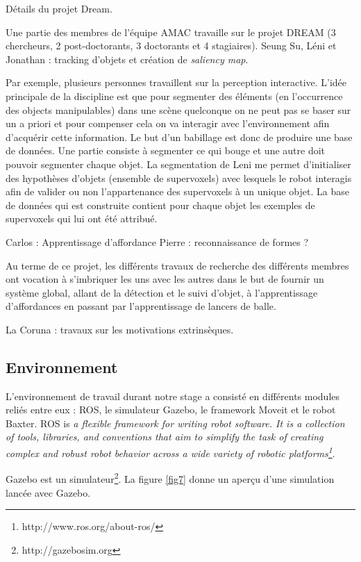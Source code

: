 \documentclass{llncs}
\begin{document}
Détails du projet Dream.

Une partie des membres de l'équipe AMAC travaille sur le projet DREAM (3 chercheurs, 2 post-doctorants, 3 doctorants et 4 stagiaires).
Seung Su, Léni et Jonathan : tracking d'objets et création de \textit{saliency map}.

Par exemple, plusieurs personnes travaillent sur la perception interactive. L'idée principale de la discipline est que pour segmenter des éléments (en l'occurrence des objects manipulables) dans une scène quelconque on ne peut pas se baser sur un a priori et pour compenser cela on va interagir avec l'environnement afin d'acquérir cette information. Le but d'un babillage est donc de produire une base de données. Une partie consiste à segmenter ce qui bouge et une autre doit pouvoir segmenter chaque objet. La segmentation de Leni me permet d'initialiser des hypothèses d'objets (ensemble de supervoxels) avec lesquels le robot interagis afin de valider ou non l'appartenance des supervoxels à un unique objet. La base de données qui est construite contient pour chaque objet les exemples de supervoxels qui lui ont été attribué.

Carlos : Apprentissage d'affordance
Pierre : reconnaissance de formes ?

Au terme de ce projet, les différents travaux de recherche des différents membres ont vocation à s'imbriquer les uns avec les autres dans le but de fournir un système global, allant de la détection et le suivi d'objet, à l'apprentissage d'affordances en passant par l'apprentissage de lancers de balle.

La Coruna : travaux sur les motivations extrinsèques.

\subsection{Environnement}

L'environnement de travail durant notre stage a consisté en différents modules reliés entre eux : ROS,  le simulateur  Gazebo, le framework Moveit et le robot Baxter. ROS is \textit{a flexible framework for writing robot software. It is a collection of tools, libraries, and conventions that aim to simplify the task of creating complex and robust robot behavior across a wide variety of robotic platforms\footnote{http://www.ros.org/about-ros/}}.

Gazebo est un simulateur\footnote{http://gazebosim.org}. La figure \ref{fig7} donne un aperçu d'une simulation lancée avec Gazebo.
\end{document}
